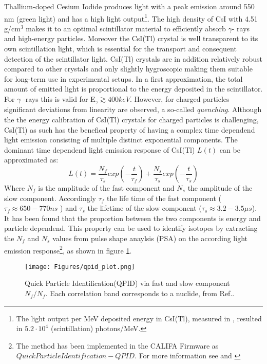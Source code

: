 Thallium-doped Cesium Iodide produces light with a peak emission around 550 nm (green light) and has a high light output\footnote{The light output per MeV deposited energy in CsI(Tl), measured in \cite{holl1988measurement}, resulted in  $5.2\cdot10^{4}$ (scintillation) photons/MeV.}. The high density of CsI with 4.51 g/cm$^3$ makes it to an optimal scintillator material to efficiently absorb $\gamma$- rays and high-energy particles. Moreover the CsI(Tl) crystal is well transparent to its own scintillation light, which is essential for the transport and consequent  detection of the scintillator light. CsI(Tl) crystals are in addition relatively robust compared to other crystals and only slightly hygroscopic making them suitable for long-term use in experimental setups.\newline
In a first approximation, the total amount of emitted light is proportional to the energy deposited in the scintillator. For $\gamma$ -rays this is valid for E$_{\gamma} \gtrsim 400 keV$\cite{syntfeld2007non}. However, for charged particles significant deviations from linearity are observed, a so-called \textit{quenching}\cite{murray1961scintillation}.\newline
Although the the energy calibration of CsI(Tl) crystals for charged particles is challenging, CsI(Tl) as such  has the benefical property of having a complex time dependend light emission consisting of multiple distinct exponential components. The dominant time dependend light emission response of CsI(Tl) $L(t)$ can be approximated as:
\begin{equation}
L(t) = \frac{N_f}{\tau_s} exp(-\frac{t}{\tau_f}) + \frac{N_s}{\tau_s} exp(-\frac{t}{\tau_s})
\end{equation}
Where $N_{f}$ is the amplitude of the fast component and $N_{s}$ the amplitude of the slow component. Accordingly $\tau_{f}$ the life time of the fast component ($\tau_{f} \approx 650-770 ns$ ) and $\tau_{s}$ the lifetime of the slow component ($\tau_{s} \approx 3.2 - 3.5\mu s$). It has been found that the proportion between the two components is energy and particle dependend. This property can be used to identify isotopes by extracting the $N_{f}$ and $N_{s}$ values from pulse shape anaylsis (PSA) on the according light emission response\footnote{The method has been implemented in the CALIFA Firmware as $Quick Particle Identification -QPID$. For more information see \cite{winkel2011implementierung} and \cite{winkel2016komplexe}}, as shown in figure \ref{fig:qpid_califa}.\newline  
\begin{figure}[htpb]
    \centering
    \texttt{[image: Figures/qpid\_plot.png]}
    \caption{
    Quick Particle Identification(QPID) via fast and slow component $N_{f} / N_{f}$. Each correlation band corresponds to a nuclide, from Ref.\cite{winkel2016komplexe}.
    }
    \label{fig:qpid_califa}
\end{figure}

